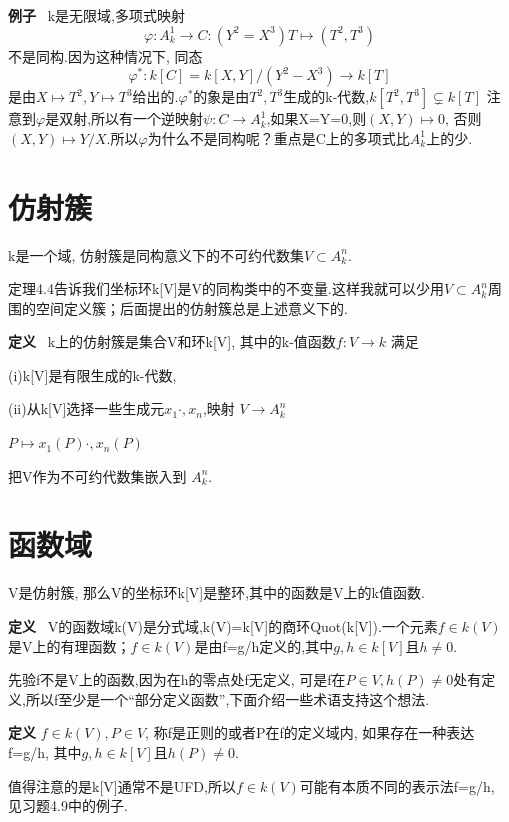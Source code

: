 \documentclass[UTF8]{book}
\begin{document}
		\textbf{例子} \ k是无限域,多项式映射
		\begin{equation*}
		\varphi:A^{1}_{k}\rightarrow C:(Y^{2}=X^{3})  T\mapsto (T^{2},T^{3})
		\end{equation*}
		不是同构.因为这种情况下, 同态
		\begin{equation*}
		\varphi^{*}:k[C]=k[X,Y]/(Y^{2}-X^{3})\rightarrow k[T]
		\end{equation*}
		是由$X\mapsto T^{2},Y\mapsto T^{3}$给出的.$\varphi^{*}$的象是由$T^{2},T^{3}$生成的k-代数,$k[T^{2},T^{3}]\subsetneq k[T]$
		注意到$\varphi$是双射,所以有一个逆映射$\psi :C\rightarrow A^{1}_{k}$,如果X=Y=0,则$(X,Y)\mapsto 0$, 否则$(X,Y)\mapsto Y/X$.所以$\varphi$为什么不是同构呢？重点是C上的多项式比$A^{1}_{k}$上的少.
	\section{仿射簇}
		k是一个域, 仿射簇是同构意义下的不可约代数集$V\subset A^{n}_{k}$.

		定理4.4告诉我们坐标环k[V]是V的同构类中的不变量.这样我就可以少用$V\subset A^{n}_{k}$周围的空间定义簇；后面提出的仿射簇总是上述意义下的.

		\textbf{定义} \ k上的仿射簇是集合V和环k[V], 其中的k-值函数$f:V\rightarrow k$ 满足

		(i)k[V]是有限生成的k-代数,

		(ii)从k[V]选择一些生成元$x_{1}  \cdot, x_{n}$,映射
		\center $ V \rightarrow  A^{n}_{k}$


		$P\mapsto x_{1}(P)  \cdot, x_{n}(P)$

		\justifying
		把V作为不可约代数集嵌入到 $A^{n}_{k}$.
		\section{函数域}V是仿射簇, 那么V的坐标环k[V]是整环,其中的函数是V上的k值函数.

		\textbf{定义} \ V的函数域k(V)是分式域,k(V)=k[V]的商环Quot(k[V]).一个元素$f\in k(V)$是V上的有理函数；$f\in k(V)$是由f=g/h定义的,其中$g,h\in k[V]$且$h\neq 0$.

		先验f不是V上的函数,因为在h的零点处f无定义, 可是f在$P\in V,h(P)\neq 0$处有定义,所以f至少是一个“部分定义函数”,下面介绍一些术语支持这个想法.

		\textbf{定义} $f\in k(V),P\in V$, 称f是正则的或者P在f的定义域内, 如果存在一种表达f=g/h, 其中$g,h\in k[V]$且$h(P)\neq 0$.

		值得注意的是k[V]通常不是UFD,所以$f\in k(V)$可能有本质不同的表示法f=g/h, 见习题4.9中的例子.
\end{document}
